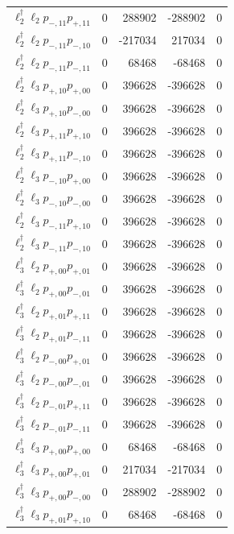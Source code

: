 \begin{longtable}{@{}lrrrr@{}}
$\ell_{2}^\dagger \ell_{2} p_{-,11} p_{+,11}$ & 0 & 288902 & -288902 & 0 \\
$\ell_{2}^\dagger \ell_{2} p_{-,11} p_{-,10}$ & 0 & -217034 & 217034 & 0 \\
$\ell_{2}^\dagger \ell_{2} p_{-,11} p_{-,11}$ & 0 & 68468 & -68468 & 0 \\
$\ell_{2}^\dagger \ell_{3} p_{+,10} p_{+,00}$ & 0 & 396628 & -396628 & 0 \\
$\ell_{2}^\dagger \ell_{3} p_{+,10} p_{-,00}$ & 0 & 396628 & -396628 & 0 \\
$\ell_{2}^\dagger \ell_{3} p_{+,11} p_{+,10}$ & 0 & 396628 & -396628 & 0 \\
$\ell_{2}^\dagger \ell_{3} p_{+,11} p_{-,10}$ & 0 & 396628 & -396628 & 0 \\
$\ell_{2}^\dagger \ell_{3} p_{-,10} p_{+,00}$ & 0 & 396628 & -396628 & 0 \\
$\ell_{2}^\dagger \ell_{3} p_{-,10} p_{-,00}$ & 0 & 396628 & -396628 & 0 \\
$\ell_{2}^\dagger \ell_{3} p_{-,11} p_{+,10}$ & 0 & 396628 & -396628 & 0 \\
$\ell_{2}^\dagger \ell_{3} p_{-,11} p_{-,10}$ & 0 & 396628 & -396628 & 0 \\
$\ell_{3}^\dagger \ell_{2} p_{+,00} p_{+,01}$ & 0 & 396628 & -396628 & 0 \\
$\ell_{3}^\dagger \ell_{2} p_{+,00} p_{-,01}$ & 0 & 396628 & -396628 & 0 \\
$\ell_{3}^\dagger \ell_{2} p_{+,01} p_{+,11}$ & 0 & 396628 & -396628 & 0 \\
$\ell_{3}^\dagger \ell_{2} p_{+,01} p_{-,11}$ & 0 & 396628 & -396628 & 0 \\
$\ell_{3}^\dagger \ell_{2} p_{-,00} p_{+,01}$ & 0 & 396628 & -396628 & 0 \\
$\ell_{3}^\dagger \ell_{2} p_{-,00} p_{-,01}$ & 0 & 396628 & -396628 & 0 \\
$\ell_{3}^\dagger \ell_{2} p_{-,01} p_{+,11}$ & 0 & 396628 & -396628 & 0 \\
$\ell_{3}^\dagger \ell_{2} p_{-,01} p_{-,11}$ & 0 & 396628 & -396628 & 0 \\
$\ell_{3}^\dagger \ell_{3} p_{+,00} p_{+,00}$ & 0 & 68468 & -68468 & 0 \\
$\ell_{3}^\dagger \ell_{3} p_{+,00} p_{+,01}$ & 0 & 217034 & -217034 & 0 \\
$\ell_{3}^\dagger \ell_{3} p_{+,00} p_{-,00}$ & 0 & 288902 & -288902 & 0 \\
$\ell_{3}^\dagger \ell_{3} p_{+,01} p_{+,10}$ & 0 & 68468 & -68468 & 0 \\

\end{longtable}
